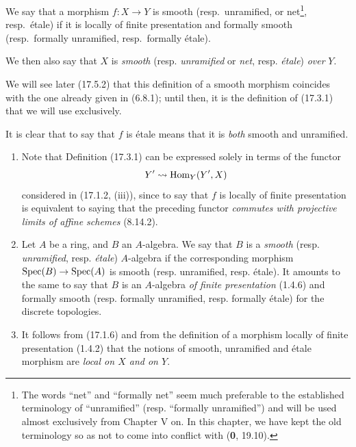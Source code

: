 \begin{definition}[17.3.1]\label{IV.17.3.1}
We say that a morphism $f:X\to Y$ is smooth \textup{(resp.}\ unramified, \textup{or} net\footnote{The words ``net'' and ``formally net'' seem much preferable to the established terminology of ``unramified'' (resp. ``formally unramified'') and will be used almost exclusively from Chapter V on. In this chapter, we have kept the old terminology so as not to come into conflict with (\textbf{0}, 19.10).}, \textup{resp.}\ étale\textup{)} if it is locally of finite presentation and formally smooth \textup{(resp.}\ formally unramified, \textup{resp.}\ formally étale\textup{)}.
\end{definition}

We then also say that $X$ is \emph{smooth} (resp. \emph{unramified} or \emph{net}, resp. \emph{étale}) \emph{over} $Y$.

We will see later (17.5.2) that this definition of a smooth morphism coincides with the one already given in (6.8.1); until then, it is the definition of (17.3.1) that we will use exclusively.

It is clear that to say that $f$ is étale means that it is \emph{both} smooth and unramified.

\begin{remarks}[17.3.2]\label{IV.17.3.2}
\begin{enumerate}
  \item[(i)] Note that Definition (17.3.1) can be expressed solely in terms of the functor
  \[
    Y'\leadsto\operatorname{Hom}_Y(Y',X)
  \]
  considered in (17.1.2, (iii)), since to say that $f$ is locally of finite presentation is equivalent to saying that the preceding functor \emph{commutes with projective limits of affine schemes} (8.14.2).
  \item[\textup{(ii)}] Let $A$ be a ring, and $B$ an $A$-algebra. We say that $B$ is a \emph{smooth} (resp. \emph{unramified}, resp. \emph{étale}) $A$-algebra if the corresponding morphism $\operatorname{Spec}(B)\to\operatorname{Spec}(A)$ is smooth (resp. unramified, resp. étale). It amounts to the same to say that $B$ is an $A$-algebra \emph{of finite presentation} (1.4.6) and formally smooth (resp. formally unramified, resp. formally étale) for the discrete topologies.
  \item[(iii)] It follows from (17.1.6) and from the definition of a morphism locally of finite presentation (1.4.2) that the notions of smooth, unramified and étale morphism are \emph{local on $X$ and on $Y$}.
\end{enumerate}
\end{remarks}

